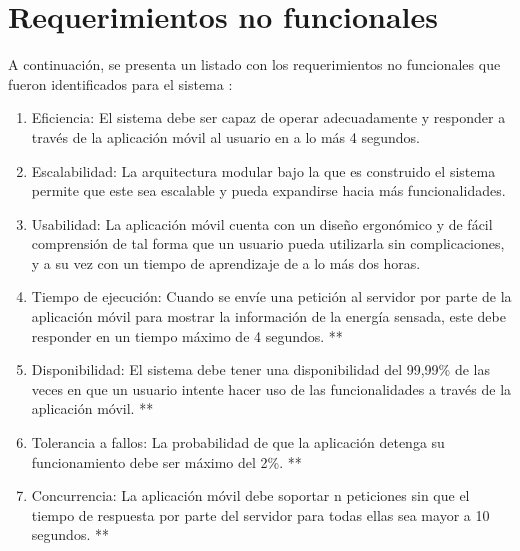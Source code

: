 \section{Requerimientos no funcionales}
A continuación, se presenta un listado con los requerimientos no funcionales \citep{RNF1} que fueron identificados para el sistema :
\begin{enumerate}[label=RNF\arabic*.]
    \item Eficiencia: El sistema debe ser capaz de operar adecuadamente y responder a través de la aplicación móvil al usuario en a lo más 4 segundos.
	
	\item Escalabilidad: La arquitectura modular bajo la que es construido el sistema permite que este sea escalable y pueda expandirse hacia más funcionalidades.
	
	
	\item Usabilidad: La aplicación móvil cuenta con un diseño ergonómico y de fácil comprensión de tal forma que un usuario pueda utilizarla sin complicaciones, y a su vez con un tiempo de aprendizaje de a lo más dos horas.
	\item Tiempo de ejecución: Cuando se envíe una petición al servidor por parte de la aplicación móvil para mostrar la información de la energía sensada, este debe responder en un tiempo máximo de 4 segundos. **
	\item Disponibilidad: El sistema debe tener una disponibilidad del 99,99\% de las veces en que un usuario intente hacer uso de las funcionalidades a través de la aplicación móvil. **
	\item Tolerancia a fallos: La probabilidad de que la aplicación detenga su funcionamiento debe ser máximo del 2\%. **
	\item Concurrencia: La aplicación móvil debe soportar n peticiones sin que el tiempo de respuesta por parte del servidor para todas ellas sea mayor a 10 segundos. **
\end{enumerate}